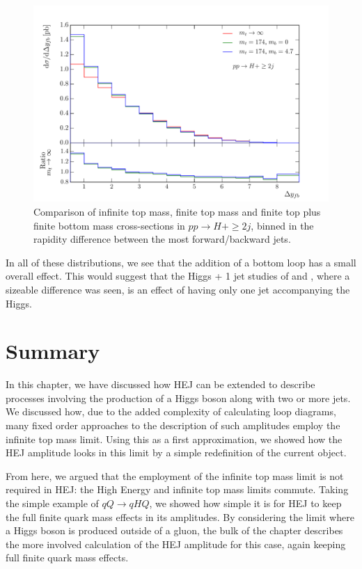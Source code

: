 \begin{figure}[t]
\centering
\includegraphics[scale=0.64]{Images/Higgs_Plots/dyfb_compare_all.pdf}
\caption{Comparison of infinite top mass, finite top mass and finite top plus finite bottom mass cross-sections in $pp \to H+\geq2j$, binned in the rapidity difference between the most forward/backward jets.}
\label{fig:hjj_dy}
\end{figure}

In all of these distributions, we see that the addition of a bottom loop has a small overall effect. This would suggest that the Higgs + 1 jet studies of \cite{Lindert2017} and \cite{Grazzini2013}, where a sizeable difference was seen, is an effect of having only one jet accompanying the Higgs. 

\section{Summary}
In this chapter, we have discussed how HEJ can be extended to describe processes involving the production of a Higgs boson along with two or more jets. We discussed how, due to the added complexity of calculating loop diagrams, many fixed order approaches to the description of such amplitudes employ the infinite top mass limit. Using this as a first approximation, we showed how the HEJ amplitude looks in this limit by a simple redefinition of the current object. 

From here, we argued that the employment of the infinite top mass limit is not required in HEJ: the High Energy and infinite top mass limits commute. Taking the simple example of $qQ \to qHQ$, we showed how simple it is for HEJ to keep the full finite quark mass effects in its amplitudes. By considering the limit where a Higgs boson is produced outside of a gluon, the bulk of the chapter describes the more involved calculation of the HEJ amplitude for this case, again keeping full finite quark mass effects. 

